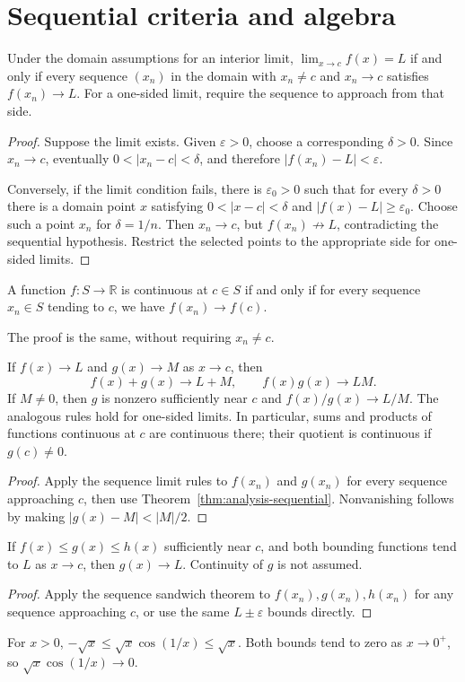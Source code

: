 \section{Sequential criteria and algebra}
\begin{theorem}\label{thm:analysis-sequential}
Under the domain assumptions for an interior limit,
$\lim_{x\to c}f(x)=L$ if and only if every sequence $(x_n)$ in the domain
with $x_n\ne c$ and $x_n\to c$ satisfies $f(x_n)\to L$.
For a one-sided limit, require the sequence to approach from that side.
\end{theorem}
\begin{proof}
Suppose the limit exists. Given $\varepsilon>0$, choose a corresponding
$\delta>0$. Since $x_n\to c$, eventually $0<|x_n-c|<\delta$, and therefore
$|f(x_n)-L|<\varepsilon$.

Conversely, if the limit condition fails, there is $\varepsilon_0>0$ such
that for every $\delta>0$ there is a domain point $x$ satisfying
$0<|x-c|<\delta$ and $|f(x)-L|\geq\varepsilon_0$.
Choose such a point $x_n$ for $\delta=1/n$. Then $x_n\to c$, but
$f(x_n)\not\to L$, contradicting the sequential hypothesis.
Restrict the selected points to the appropriate side for one-sided limits.
\end{proof}

\begin{corollary}
A function $f:S\to\mathbb R$ is continuous at $c\in S$ if and only if
for every sequence $x_n\in S$ tending to $c$, we have $f(x_n)\to f(c)$.
\end{corollary}
The proof is the same, without requiring $x_n\ne c$.

\begin{theorem}
If $f(x)\to L$ and $g(x)\to M$ as $x\to c$, then
\[
f(x)+g(x)\to L+M,\qquad f(x)g(x)\to LM.
\]
If $M\ne0$, then $g$ is nonzero sufficiently near $c$ and
$f(x)/g(x)\to L/M$. The analogous rules hold for one-sided limits.
In particular, sums and products of functions continuous at $c$ are
continuous there; their quotient is continuous if $g(c)\ne0$.
\end{theorem}
\begin{proof}
Apply the sequence limit rules to $f(x_n)$ and $g(x_n)$ for every sequence
approaching $c$, then use Theorem~\ref{thm:analysis-sequential}.
Nonvanishing follows by making $|g(x)-M|<|M|/2$.
\end{proof}

\begin{theorem}
If $f(x)\leq g(x)\leq h(x)$ sufficiently near $c$, and both bounding
functions tend to $L$ as $x\to c$, then $g(x)\to L$.
Continuity of $g$ is not assumed.
\end{theorem}
\begin{proof}
Apply the sequence sandwich theorem to $f(x_n),g(x_n),h(x_n)$ for any
sequence approaching $c$, or use the same $L\pm\varepsilon$ bounds directly.
\end{proof}
\begin{example}
For $x>0$, $-\sqrt x\leq\sqrt x\cos(1/x)\leq\sqrt x$. Both bounds tend
to zero as $x\to0^+$, so $\sqrt x\cos(1/x)\to0$.
\end{example}

